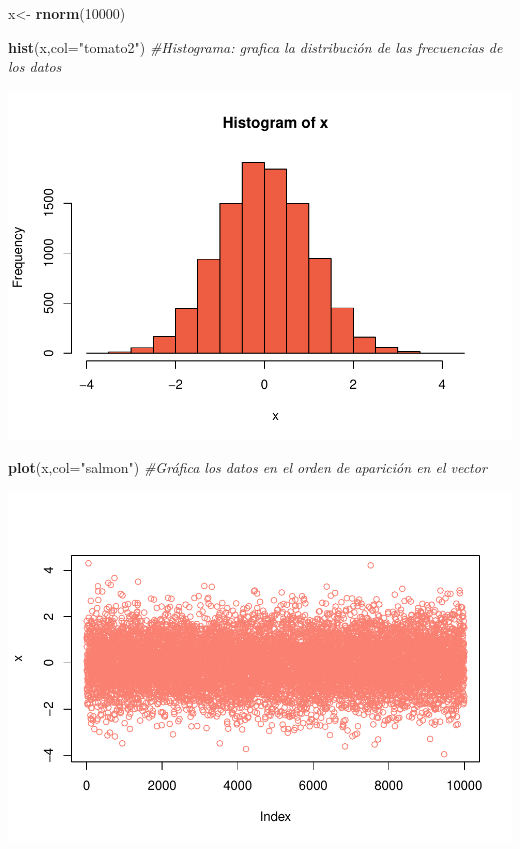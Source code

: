 \documentclass[
]{book}
\newenvironment{Shaded}{\begin{snugshade}}{\end{snugshade}}
\newcommand{\AttributeTok}[1]{\textcolor[rgb]{0.13,0.29,0.53}{#1}}
\newcommand{\CommentTok}[1]{\textcolor[rgb]{0.56,0.35,0.01}{\textit{#1}}}
\newcommand{\DecValTok}[1]{\textcolor[rgb]{0.00,0.00,0.81}{#1}}
\newcommand{\FunctionTok}[1]{\textcolor[rgb]{0.13,0.29,0.53}{\textbf{#1}}}
\newcommand{\NormalTok}[1]{#1}
\newcommand{\OtherTok}[1]{\textcolor[rgb]{0.56,0.35,0.01}{#1}}
\newcommand{\StringTok}[1]{\textcolor[rgb]{0.31,0.60,0.02}{#1}}
\begin{document}
\begin{Shaded}
\begin{Highlighting}[]
\NormalTok{x}\OtherTok{\textless{}{-}} \FunctionTok{rnorm}\NormalTok{(}\DecValTok{10000}\NormalTok{)}

\FunctionTok{hist}\NormalTok{(x,}\AttributeTok{col=}\StringTok{"tomato2"}\NormalTok{) }\CommentTok{\#Histograma: grafica la distribución de las frecuencias de los datos }
\end{Highlighting}
\end{Shaded}

\includegraphics{bookdown-demo_files/figure-latex/unnamed-chunk-77-1.pdf}

\begin{Shaded}
\begin{Highlighting}[]
\FunctionTok{plot}\NormalTok{(x,}\AttributeTok{col=}\StringTok{"salmon"}\NormalTok{) }\CommentTok{\#Gráfica los datos en el orden de aparición en el vector }
\end{Highlighting}
\end{Shaded}

\includegraphics{bookdown-demo_files/figure-latex/unnamed-chunk-77-2.pdf}
\end{document}

